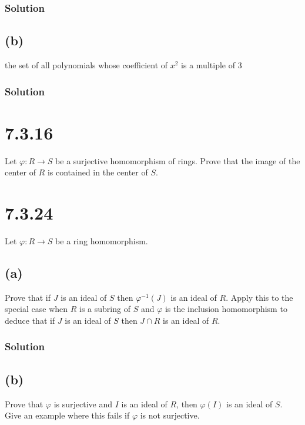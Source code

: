 \documentclass[fleqn]{article}
\begin{document}
            \subsubsection{Solution}
            
        
        \subsection{(b)}
        the set of all polynomials whose coefficient of $x^2$ is a multiple of 3
        
            \subsubsection{Solution}
            
    
    \section{7.3.16}
    Let $\varphi: R \to S$ be a surjective homomorphism of rings.  Prove that the image of the center of $R$ is contained in the center of $S$.
    
    \section{7.3.24}
    Let $\varphi: R \to S$ be a ring homomorphism.
        
        \subsection{(a)}
        Prove that if $J$ is an ideal of $S$ then $\varphi^{-1}(J)$ is an ideal of $R$.  Apply this to the special case when $R$ is a subring of $S$ and $\varphi$ is the inclusion homomorphism to deduce that if $J$ is an ideal of $S$ then $J \cap R$ is an ideal of $R$.
            
            \subsubsection{Solution}
            
        
        \subsection{(b)}
        Prove that $\varphi$ is surjective and $I$ is an ideal of $R$, then $\varphi(I)$ is an ideal of $S$.  Give an example where this fails if $\varphi$ is not surjective.
        
\end{document}
